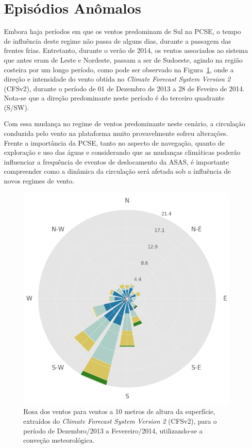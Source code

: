\section{Episódios Anômalos}
\label{sec:anomamlousEpisodes}

\hspace{5mm} Embora haja períodos em que os ventos predominam de Sul na PCSE, o tempo de
influência deste regime não passa de alguns dias, durante a passagem das frentes frias.
Entretanto, durante o verão de 2014, os ventos associados ao sistema que antes eram de Leste e
Nordeste, passam a ser de Sudoeste, agindo na região costeira por um longo período, como
pode ser observado na Figura~\ref{fig:a701}, onde a direção e intensidade do vento
obtida no \textit{Climate Forecast System Version 2} (CFSv2), durante o período de
01 de Dezembro de 2013 a 28 de Feveiro de 2014. Nota-se que a direção
predominante neste período é do terceiro quadrante (S/SW).

\hspace{5mm} Com essa mudança no regime de ventos predominante neste
cenário, a circulação conduzida pelo vento na plataforma muito provavelmente sofreu alterações.
Frente a importância da PCSE, tanto no aspecto de navegação, quanto de
exploração e uso das águas e considerando que as mudanças climáticas poderão
influenciar a frequência de eventos de deslocamento da ASAS, é importante compreender
como a dinâmica da circulação será afetada sob a influência de novos regimes
de vento.

\begin{figure}[!h]
    \centering
    \includegraphics[width=0.65\linewidth]{figuras/windrose_2014CFSv2.png}
\caption[Rosa dos Ventos para Dezembro/2013 a Fevereiro/2014]{Rosa dos ventos para ventos a 10 metros de altura da superfície, extraídos do \textit{Climate Forecast System Version 2} (CFSv2), para o período de Dezembro/2013 a Fevereiro/2014, utilizando-se a conveção meteorológica.}
    \label{fig:a701}
\end{figure}

